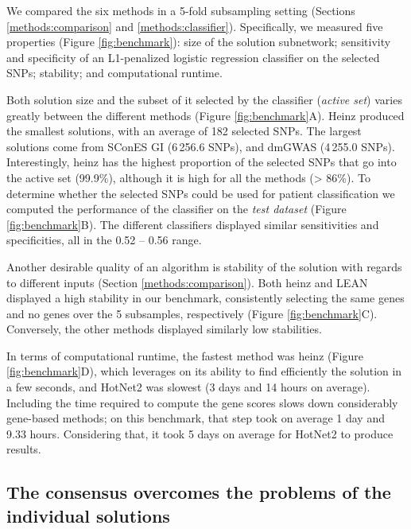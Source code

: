 \documentclass[twocolumn, 11pt, draft]{article}
\begin{document}
We compared the six methods in a 5-fold subsampling setting (Sections \ref{methods:comparison} and \ref{methods:classifier}). Specifically, we measured five properties (Figure \ref{fig:benchmark}): size of the solution subnetwork; sensitivity and specificity of an L1-penalized logistic regression classifier on the selected SNPs; stability; and computational runtime.

Both solution size and the subset of it selected by the classifier (\emph{active set}) varies greatly between the different methods (Figure \ref{fig:benchmark}A). Heinz produced the smallest solutions, with an average of 182 selected SNPs. The largest solutions come from SConES GI (6\,256.6 SNPs), and dmGWAS (4\,255.0 SNPs). Interestingly, heinz has the highest proportion of the selected SNPs that go into the active set (99.9\%), although it is  high for all the methods (> 86\%). To determine whether the selected SNPs could be used for patient classification we computed the performance of the classifier on the \emph{test dataset} (Figure \ref{fig:benchmark}B). The different classifiers displayed similar sensitivities and specificities, all in the 0.52 -- 0.56 range.

Another desirable quality of an algorithm is stability of the solution with regards to different inputs (Section \ref{methods:comparison}). Both heinz and LEAN displayed a high stability in our benchmark, consistently selecting the same genes and no genes over the 5 subsamples, respectively (Figure \ref{fig:benchmark}C). Conversely, the other methods displayed similarly low stabilities. 

In terms of computational runtime, the fastest method was heinz (Figure \ref{fig:benchmark}D), which leverages on its ability to find efficiently the solution in a few seconds, and HotNet2 was slowest (3 days and 14 hours on average). Including the time required to compute the gene scores slows down considerably gene-based methods; on this benchmark, that step took on average 1 day and 9.33 hours. Considering that, it took 5 days on average for HotNet2 to produce results. 

\subsection{The consensus overcomes the problems of the individual solutions}
\label{results:drawbacks}
\end{document}

